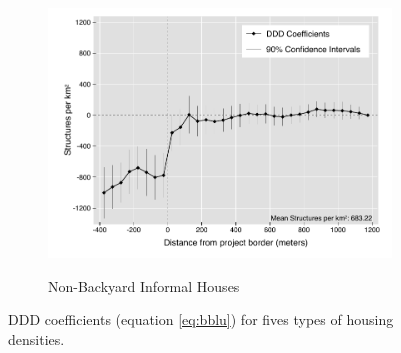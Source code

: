 \documentclass[12pt]{article}
\begin{document}
\begin{figure}[t!]
\begin{subfigure}[b]{0.49\textwidth}
        \label{fig:DDDbackyard}
    \end{subfigure}
    \vskip 1mm \vskip 0pt
    \begin{subfigure}[b]{.49\textwidth}  
        \centering
        \caption[]{\small Non-Backyard Informal Houses} 
        \vspace{-1mm}
        \includegraphics[width=\textwidth,trim={.5cm .3cm .3cm 0cm}, clip=true]{figures/distplotDDD_bblu_inf_non_backyard_admin_5.pdf}    
        \label{fig:DDDnonbackyard}
    \end{subfigure}
    \hfill \hspace{.02\textwidth}
    \begin{minipage}{0.47\textwidth}   
    \vspace{-6cm}
    \caption[]
    {\small DDD coefficients (equation \ref{eq:bblu}) for fives types of housing densities.} \label{fig:DDDbblu}
	\end{minipage}
\end{figure} 
\end{document}
